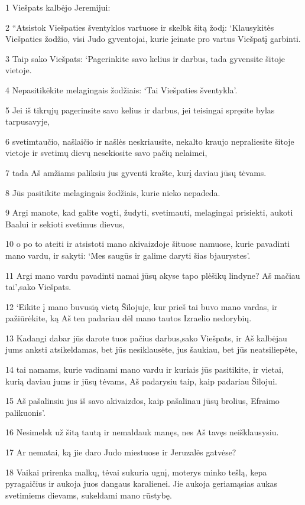 \par 1 Viešpats kalbėjo Jeremijui: 
\par 2 “Atsistok Viešpaties šventyklos vartuose ir skelbk šitą žodį: ‘Klausykitės Viešpaties žodžio, visi Judo gyventojai, kurie įeinate pro vartus Viešpatį garbinti. 
\par 3 Taip sako Viešpats: ‘Pagerinkite savo kelius ir darbus, tada gyvensite šitoje vietoje. 
\par 4 Nepasitikėkite melagingais žodžiais: ‘Tai Viešpaties šventykla’. 
\par 5 Jei iš tikrųjų pagerinsite savo kelius ir darbus, jei teisingai spręsite bylas tarpusavyje, 
\par 6 svetimtaučio, našlaičio ir našlės neskriausite, nekalto kraujo nepraliesite šitoje vietoje ir svetimų dievų nesekiosite savo pačių nelaimei, 
\par 7 tada Aš amžiams paliksiu jus gyventi krašte, kurį daviau jūsų tėvams. 
\par 8 Jūs pasitikite melagingais žodžiais, kurie nieko nepadeda. 
\par 9 Argi manote, kad galite vogti, žudyti, svetimauti, melagingai prisiekti, aukoti Baalui ir sekioti svetimus dievus, 
\par 10 o po to ateiti ir atsistoti mano akivaizdoje šituose namuose, kurie pavadinti mano vardu, ir sakyti: ‘Mes saugūs ir galime daryti šias bjaurystes’. 
\par 11 Argi mano vardu pavadinti namai jūsų akyse tapo plėšikų lindyne? Aš mačiau tai’,­sako Viešpats. 
\par 12 ‘Eikite į mano buvusią vietą Šilojuje, kur prieš tai buvo mano vardas, ir pažiūrėkite, ką Aš ten padariau dėl mano tautos Izraelio nedorybių. 
\par 13 Kadangi dabar jūs darote tuos pačius darbus,­sako Viešpats,­ ir Aš kalbėjau jums anksti atsikeldamas, bet jūs nesiklausėte, jus šaukiau, bet jūs neatsiliepėte, 
\par 14 tai namams, kurie vadinami mano vardu ir kuriais jūs pasitikite, ir vietai, kurią daviau jums ir jūsų tėvams, Aš padarysiu taip, kaip padariau Šilojui. 
\par 15 Aš pašalinsiu jus iš savo akivaizdos, kaip pašalinau jūsų brolius, Efraimo palikuonis’. 
\par 16 Nesimelsk už šitą tautą ir nemaldauk manęs, nes Aš tavęs neišklausysiu. 
\par 17 Ar nematai, ką jie daro Judo miestuose ir Jeruzalės gatvėse? 
\par 18 Vaikai prirenka malkų, tėvai sukuria ugnį, moterys minko tešlą, kepa pyragaičius ir aukoja juos dangaus karalienei. Jie aukoja geriamąsias aukas svetimiems dievams, sukeldami mano rūstybę. 
